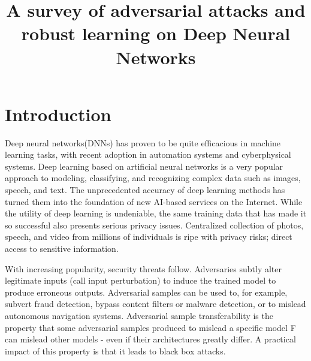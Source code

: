 \documentclass{article}
\begin{document}
	\title{A survey of adversarial attacks and robust learning on Deep Neural Networks}
	\maketitle
	
\section{Introduction}
Deep neural networks(DNNs) has proven to be quite efficacious in machine learning tasks, with recent adoption in automation systems and cyberphysical systems. Deep learning based on artificial neural networks is a very popular approach to modeling, classifying, and recognizing
complex data such as images, speech, and text. The unprecedented accuracy of deep learning methods has turned them into the foundation of new AI-based services on the Internet.
While the utility of deep learning is undeniable, the same
training data that has made it so successful also presents serious privacy issues. Centralized collection of photos,
speech, and video from millions of individuals is ripe with privacy risks; direct access to sensitive information.

With increasing popularity, security threats follow. Adversaries subtly alter legitimate
inputs (call input perturbation) to induce the trained model to produce erroneous outputs.
Adversarial samples can be used to, for
example, subvert fraud detection, bypass content filters or malware detection, or to mislead autonomous navigation systems. Adversarial sample transferability is the property that some adversarial samples produced to mislead a specific model F can mislead other models - even if their architectures greatly differ. A practical impact of this property is that it leads to black box attacks. 
\end{document}
